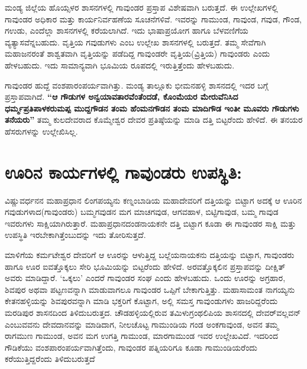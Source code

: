 ಮಂಡ್ಯ ಜಿಲ್ಲೆಯ ಹೊಯ್ಸಳರ ಶಾಸನಗಳಲ್ಲಿ ಗಾವುಂಡರ ಪ್ರಸ್ತಾಪ ವಿಶೇಷವಾಗಿ ಬರುತ್ತದೆ. ಈ ಉಲ್ಲೇಖಗಳಲ್ಲಿ ಗಾವುಂಡರ ಅಧಿಕಾರ ಮತ್ತು ಕಾರ್ಯನಿರ್ವಹಣೆಯ ಸೂಚನೆಗಳಿವೆ. ಇವರನ್ನು ಗಾಮುಂಡ, ಗಾವುಂಡ, ಗವುಡ, ಗೌಂಡ, ಗಉಡು, ಎಂದೆಲ್ಲಾ ಶಾಸನಗಳಲ್ಲಿ ಕರೆಯಲಾಗಿದೆ. ಇದು ಭಾಷಾಪ್ರಯೋಗ ಹಾಗೂ ಬೆಳವಣಿಗೆಯ ವ್ಯತ್ಯಾಸವೆನ್ನಬಹುದು. ವೃತ್ತಿಯ ಗವುಡುಗಳು ಎಂಬ ಉಲ್ಲೇಖ ಶಾಸನಗಳಲ್ಲಿ ಬರುತ್ತದೆ. ತಮ್ಮ ಸೇವೆಗಾಗಿ ಮಹಾಜನರಂತೆ ಶಾಶ್ವತವಾಗಿ ವೃತ್ತಿಯನ್ನು ಪಡೆದಿದ್ದ ಗಾವುಂಡರೇ ವೃತ್ತಿಯ(ವ್ರಿತ್ತಿಯ) ಗಾವುಂಡರು ಎಂದು ಹೇಳಬಹುದು. ಇದು ಸಾಮಾನ್ಯವಾಗಿ ಭೂಮಿಯ ರೂಪದಲ್ಲಿ ಇರುತ್ತಿತ್ತೆಂದು ಹೇಳಬಹುದು.

ಗಾವುಂಡರ ಹುದ್ದೆ ವಂಶಪಾರಂಪರ್ಯವಾಗಿತ್ತು. ಮಂಡ್ಯ ತಾಲ್ಲೂಕು ಭೀಮನಹಳ್ಳಿ ಶಾಸನದಲ್ಲಿ ಇದರ ಬಗ್ಗೆ ಪ್ರಸ್ತಾಪವಾಗಿದೆ. \textbf{“ಆ ಗೌಡುಗಳ ಅನ್ವಯಾವತಾರವೆಂತೆಂದಡೆ, ಕೊಂಮೆಯರ ಮೇರುವೆನಿಸಿದ ಧರ್ಮ್ಮಪ್ರತಿಪಾಳಕರುಮಪ್ಪ ಮುದ್ದಗೌಡನ ತಂಮ ಹೆಂಮನಗೌಡನ ತಂಮ ಮಾದಿಗೌಡ ಇಂತೀ ಮೂವರು ಗೌಡುಗಳು ತನೆಯರು”} ತಮ್ಮ ಕುಲದೇವರಾದ ಕೊಮ್ಮೇಶ್ವರ ದೇವರ ಪ್ರತಿಷ್ಠೆಯನ್ನು ಮಾಡಿ ದತ್ತಿ ಬಿಟ್ಟರೆಂದು ಹೇಳಿದೆ. ಈ ತನಯರ ಹೆಸರುಗಳನ್ನು ಉಲ್ಲೇಖಿಸಿಲ್ಲ.

\newpage


\section{ಊರಿನ ಕಾರ್ಯಗಳಲ್ಲಿ ಗಾವುಂಡರು ಉಪಸ್ಥಿತಿ:}

ವಿಷ್ಣುವರ್ಧನನ ಮಹಾಪ್ರಧಾನ ಲಿಂಗಪಯ್ಯನು ಕಣ್ನಂಬಾಡಿಯ ಮಹಾದೇವರಿಗೆ ದತ್ತಿಯನ್ನು ಬಿಟ್ಟಾಗ ಅದಕ್ಕೆ ಆ ಊರಿನ ಗವುಡುಗಳಾದ(ಗಾವುಂಡರು) ಬಮ್ಮಗವುಡನ ಮಗ ಮಾಚಗವುಡ, ಆಗವಹಾಳ, ಬಿಟ್ಟಿಗಾವುಡ, ಬಮ್ಮ ಗಾವುಡ ಇವರುಗಳು ಸಾಕ್ಷಿಯಾಗಿರುತ್ತಾರೆ. ಮಹಾಪ್ರಧಾನದಂಡನಾಯಕನೇ ದತ್ತಿ ಬಿಟ್ಟಾಗ ಕೂಡಾ ಈ ಗಾವುಂಡರ ಸಾಕ್ಷಿ ಮತ್ತು ಉಪಸ್ಥಿತಿ ಇರಬೇಕಾಗಿತ್ತೆಂಬುದನ್ನು ಇದು ತೋರಿಸುತ್ತದೆ.

\vskip 2pt

ಮಾಳಿಗೆಯ ಕರ್ಮಟೇಶ್ವರ ದೇವರಿಗೆ ಆ ಊರನ್ನು ಆಳುತ್ತಿದ್ದ ಬಲ್ಲೆಯನಾಯಕನು ದತ್ತಿಯನ್ನು ಬಿಟ್ಟಾಗ, ಗಾವುಂಡರು ಹಾಗೂ ಊರ ಐವತ್ತೊಕ್ಕಲು ಸೇರಿ ಭೂಮಿಯನ್ನು ಬಿಟ್ಟರೆಂದು ಹೇಳಿದೆ. ಅರವತ್ತೊಕ್ಕಲಿನ ಪ್ರಸ್ತಾಪವನ್ನು ದೀಕ್ಷಿತ್​ ಅವರು ಮಾಡಿದ್ದಾರೆ. `ಒಕ್ಕಲು' ಎಂದರೆ ಗಾವುಂಡರ ಸಂಘ ಎಂದು ಹೇಳಬಹುದು. ಒಂದು ಊರನ್ನು ಅಗ್ರಹಾರ, ಶಿವಪುರ ಅಥವಾ ಪಟ್ಟಣವನ್ನಾಗಿ ಮಾಡುವಾಗಲೂ ಗಾವುಂಡರ ಒಪ್ಪಿಗೆ ಬೇಕಾಗುತ್ತಿತ್ತು. ಮಹಾಸಾಮಂತ ನಾಗಯ್ಯನು ಕೇತನಹಳ್ಳಿಯನ್ನು ಶಿವಪುರವನ್ನಾಗಿ ಮಾಡಿ ಭಕ್ತರಿಗೆ ಕೊಟ್ಟಾಗ, ಅಲ್ಲಿ ಸಮಸ್ತ ಗಾವುಂಡುಗಳು ಹಾಜರಿದ್ದರೆಂದು ಮರಡಿಪುರ ಶಾಸನದಿಂದ ತಿಳಿದುಬರುತ್ತದ. ಚೌಡಹಳ್ಳಿಯಲ್ಲಿರುವ ತಮಿಳುಗ್ರಂಥಲಿಪಿಯ ಶಾಸನದಲ್ಲಿ ದೇವರ್​ವಲ್ಲವನ್​ ಎಂಬುವವನು ದೇವದಾನವನ್ನು ಮಾಡಿದಾಗ, ನೀಲಚೊಟ್ಟ ಗಾಮುಂಡಿಯ ಗಂಡ ಅಂಕಗಾವುಂಡ, ಅವನ ತಮ್ಮ ರಾಗಮುಣ ಗಾಮುಂಡ, ಅವನ ಮಗ ಉಗತ್ತಿ ಗಾಮುಂಡ, ಮಾರಗಾಮುಂಡ ಇವರ ಉಲ್ಲೇಖವಿದೆ. ಇದರಿಂದ ಗೌಡಿಕೆಯು ವಂಶಪಾರಂಪರ್ಯವಾಗಿತ್ತೆಂದು, ಗಾವುಂಡರ ಪತ್ನಿಯರಿಗೂ ಕೂಡಾ ಗಾಮುಂಡಿಯರೆಂದು ಕರೆಯುತ್ತಿದ್ದರೆಂದು ತಿಳಿದುಬರುತ್ತದೆ


